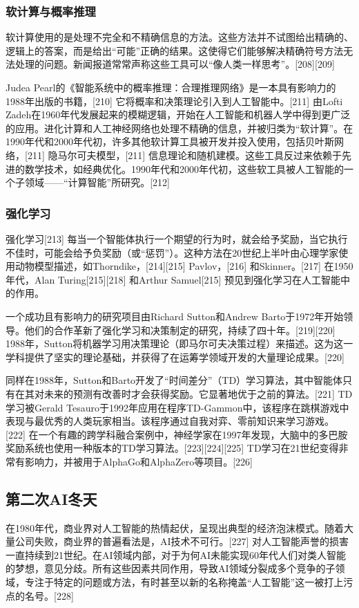 \subsubsection{软计算与概率推理}
软计算使用的是处理不完全和不精确信息的方法。这些方法并不试图给出精确的、逻辑上的答案，而是给出“可能”正确的结果。这使得它们能够解决精确符号方法无法处理的问题。新闻报道常常声称这些工具可以“像人类一样思考”。[208][209]

Judea Pearl的《智能系统中的概率推理：合理推理网络》是一本具有影响力的1988年出版的书籍，[210] 它将概率和决策理论引入到人工智能中。[211] 由Lofti Zadeh在1960年代发展起来的模糊逻辑，开始在人工智能和机器人学中得到更广泛的应用。进化计算和人工神经网络也处理不精确的信息，并被归类为“软计算”。在1990年代和2000年代初，许多其他软计算工具被开发并投入使用，包括贝叶斯网络，[211] 隐马尔可夫模型，[211] 信息理论和随机建模。这些工具反过来依赖于先进的数学技术，如经典优化。1990年代和2000年代初，这些软工具被人工智能的一个子领域——“计算智能”所研究。[212]
\subsubsection{强化学习}
强化学习[213] 每当一个智能体执行一个期望的行为时，就会给予奖励，当它执行不佳时，可能会给予负奖励（或“惩罚”）。这种方法在20世纪上半叶由心理学家使用动物模型描述，如Thorndike，[214][215] Pavlov，[216] 和Skinner。[217] 在1950年代，Alan Turing[215][218] 和Arthur Samuel[215] 预见到强化学习在人工智能中的作用。

一个成功且有影响力的研究项目由Richard Sutton和Andrew Barto于1972年开始领导。他们的合作革新了强化学习和决策制定的研究，持续了四十年。[219][220] 1988年，Sutton将机器学习用决策理论（即马尔可夫决策过程）来描述。这为这一学科提供了坚实的理论基础，并获得了在运筹学领域开发的大量理论成果。[220]

同样在1988年，Sutton和Barto开发了“时间差分”（TD）学习算法，其中智能体只有在其对未来的预测有改善时才会获得奖励。它显著地优于之前的算法。[221] TD学习被Gerald Tesauro于1992年应用在程序TD-Gammon中，该程序在跳棋游戏中表现与最优秀的人类玩家相当。该程序通过自我对弈、零前知识来学习游戏。[222] 在一个有趣的跨学科融合案例中，神经学家在1997年发现，大脑中的多巴胺奖励系统也使用一种版本的TD学习算法。[223][224][225] TD学习在21世纪变得非常有影响力，并被用于AlphaGo和AlphaZero等项目。[226]
\subsection{第二次AI冬天}  
在1980年代，商业界对人工智能的热情起伏，呈现出典型的经济泡沫模式。随着大量公司失败，商业界的普遍看法是，AI技术不可行。[227] 对人工智能声誉的损害一直持续到21世纪。在AI领域内部，对于为何AI未能实现60年代人们对类人智能的梦想，意见分歧。所有这些因素共同作用，导致AI领域分裂成多个竞争的子领域，专注于特定的问题或方法，有时甚至以新的名称掩盖“人工智能”这一被打上污点的名号。[228]

